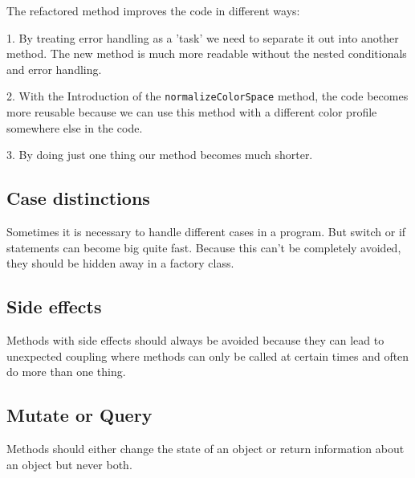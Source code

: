 The refactored method improves the code in different ways:

1. By treating error handling as a 'task' we need to separate it out into another method. The new method is much more readable without the nested conditionals and error handling.

2. With the Introduction of the \texttt{normalizeColorSpace} method, the code becomes more reusable because we can use this method with a different color profile somewhere else in the code.

3. By doing just one thing our method becomes much shorter.

\subsection{Case distinctions}
Sometimes it is necessary to handle different cases in a program. But switch or if statements can become big quite fast. Because this can't be completely  avoided, they should be hidden away in a factory class.

\subsection{Side effects}
Methods with side effects should always be avoided because they can lead to unexpected coupling where methods can only be called at certain times and often do more than one thing.

\subsection{Mutate or Query}
Methods should either change the state of an object or return information about an object but never both.
